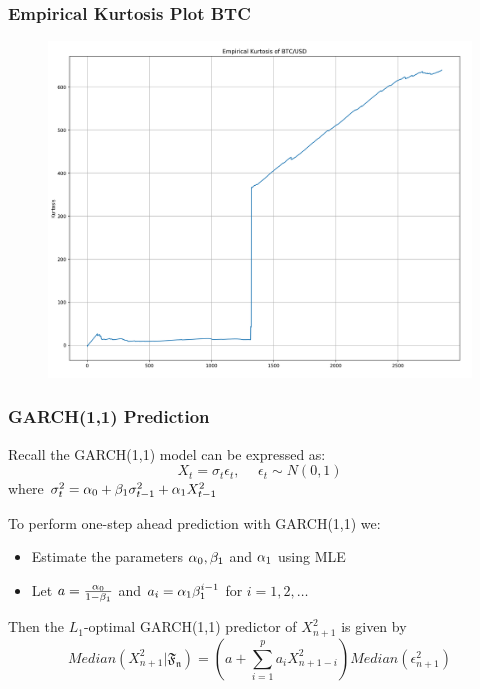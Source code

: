 \documentclass{beamer}
\begin{document}
\begin{frame}
\frametitle{Empirical Kurtosis Plot BTC}
\begin{figure}[h!]
\includegraphics[width=\textwidth]{btc_returns_kurtosis.png}
\end{figure}
\end{frame}


\begin{frame}
\frametitle{GARCH(1,1) Prediction}

Recall the GARCH(1,1) model can be expressed as: $$X_t = \sigma_{t}\epsilon_{t}, \hspace{15pt} \epsilon_{t} \sim N(0,1)$$ where $\sigma_{t}^{2} = \alpha_0 + \beta_1 \sigma_{t-1}^{2} + \alpha_1 X_{t-1}^{2}$\\

\vspace{6pt}

To perform one-step ahead prediction with GARCH(1,1) we:
\begin{itemize}
\item{Estimate the parameters $\alpha_0, \beta_1$ and $\alpha_1$ using MLE}
\item{Let $a=\frac{\alpha_0}{1-\beta_1}$ and $a_i = \alpha_1\beta_1^{i-1}$ for $i=1,2,\dots$}
\end{itemize}
\vspace{6pt}
Then the $L_1$-optimal GARCH(1,1) predictor of $X_{n+1}^2$ is given by
$$ Median(X_{n+1}^2| \mathfrak{F_{n}}) = (a + \sum_{i=1}^{p} a_i X_{n+1-i}^2)Median(\epsilon_{n+1}^2) $$


\end{frame}
\end{document}
